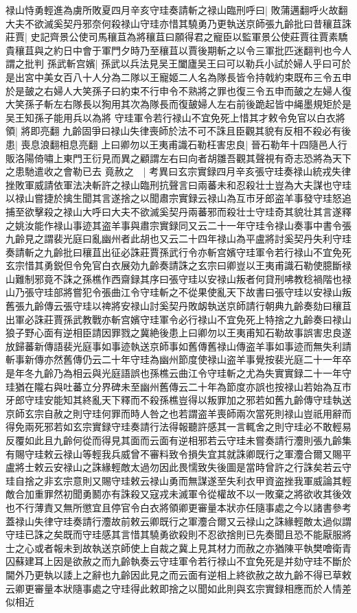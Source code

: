 禄山恃勇輕進為虜所敗夏四月辛亥守珪奏請斬之禄山臨刑呼曰|{
	敗蒲邁翻呼火故翻}
大夫不欲滅奚契丹邪奈何殺禄山守珪亦惜其驍勇乃更執送京師張九齡批曰昔穰苴誅莊賈|{
	史記齊景公使司馬穰苴為將穰苴曰願得君之寵臣以監軍景公使莊賈往賈素驕貴穰苴與之約日中會于軍門夕時乃至穰苴以賈後期斬之以令三軍批匹迷翻判也今人謂之批判}
孫武斬宫嬪|{
	孫武以兵法見吴王闔廬吴王曰可以勒兵小試於婦人乎曰可於是出宮中美女百八十人分為二隊以王寵姬二人名為隊長皆令持戟約束既布三令五申於是皷之右婦人大笑孫子曰約束不行申令不熟將之罪也復三令五申而皷之左婦人復大笑孫子斬左右隊長以狥用其次為隊長而復皷婦人左右前後跪起皆中䋲墨規矩於是吴王知孫子能用兵以為將}
守珪軍令若行禄山不宜免死上惜其才敕令免官以白衣將領|{
	將即亮翻}
九齡固爭曰禄山失律喪師於法不可不誅且臣觀其貌有反相不殺必有後患|{
	喪息浪翻相息亮翻}
上曰卿勿以王夷甫識石勒枉害忠良|{
	晉石勒年十四隨邑人行販洛陽倚嘯上東門王衍見而異之顧謂左右曰向者胡雛吾觀其聲視有奇志恐將為天下之患馳遣收之會勒已去}
竟赦之　|{
	考異曰玄宗實録四月辛亥張守珪奏禄山統戎失律挫敗軍威請依軍法决斬許之禄山臨刑抗聲言曰兩蕃未和忍殺壮士豈為大夫謀也守珪以禄山嘗捷於擒生聞其言遂捨之以聞肅宗實録云禄山為互市牙郎盗羊事發守珪怒追捕至欲擊殺之禄山大呼曰大夫不欲滅奚契丹兩蕃邪而殺壮士守珪奇其貌壮其言遂釋之姚汝能作禄山事迹其盗羊事與肅宗實録同又云二十一年守珪令禄山奏事中書令張九齡見之謂裴光庭曰亂幽州者此胡也又云二十四年禄山為平盧將討奚契丹失利守珪奏請斬之九齡批曰穰苴出征必誅莊賈孫武行令亦斬宫嬪守珪軍令若行禄山不宜免死玄宗惜其勇鋭但令免官白衣展効九齡奏請誅之玄宗曰卿豈以王夷甫識石勒使臆斷禄山難制邪竟不誅之孫樵作西齋録其序曰張守珪以安禄山叛者何貸刑咈教稔禍階也禄山乃張守珪部將嘗犯令張曲江令守珪斬之不從果使亂天下故書曰張守珪以安禄山叛舊張九齡傳云張守珪以禆將安禄山討奚契丹敗衂執送京師請行朝典九齡奏劾曰穰苴出軍必誅莊賈孫武教戰亦斬宫嬪守珪軍令必行禄山不宜免死上特捨之九齡奏曰禄山狼子野心面有逆相臣請因罪戮之冀絶後患上曰卿勿以王夷甫知石勒故事誤害忠良遂放歸蕃新傳語裴光庭事如事迹執送京師事如舊傳舊禄山傳盗羊事如事迹而無失利請斬事新傳亦然舊傳仍云二十年守珪為幽州節度使禄山盗羊事覺按裴光庭二十一年卒是年冬九齡乃為相云與光庭語誤也孫樵云曲江令守珪斬之尤為失實實録二十一年守珪猶在隴右與吐蕃立分界碑未至幽州舊傳云二十年為節度亦誤也按禄山若始為互市牙郎守珪安能知其終亂天下釋而不殺孫樵豈得以叛罪加之邪若如舊九齡傳守珪執送京師玄宗自赦之則守珪何罪而時人咎之也若謂盗羊喪師兩次當死則禄山豈祇用辭而得免兩死邪若如玄宗實録守珪奏請行法得報聽許感其一言輒舍之則守珪必不敢輕易反覆如此且九齡何從而得見其面而云面有逆相邪若云守珪未嘗奏請行灋則張九齡集有賜守珪敕云禄山等輕我兵威曾不審料致令損失宜其就誅卿既行之軍灋合爾又賜平盧將士敕云安禄山之誅緣輕敵太過勿因此畏懦致失後圖是當時曾許之行誅矣若云守珪自捨之非玄宗意則又賜守珪敕云禄山勇而無謀遂至失利衣甲資盗挫我軍威論其輕敵合加重罪然初聞勇鬭亦有誅殺又寇戎未滅軍令從權故不以一敗棄之將欲收其後效也不行薄責又無所懲宜且停官令白衣將領卿更審量本狀亦任隨事處之今以諸書參考蓋禄山失律守珪奏請行灋故前敕云卿既行之軍灋合爾又云禄山之誅緣輕敵太過似謂守珪已誅之矣既而守珪感其言惜其驍勇欲殺則不忍欲捨則已先奏聞且恐不能厭服將士之心或者報未到故執送京師使上自裁之冀上見其材力而赦之亦猶陳平執樊噲衛青囚蘇建耳上因是欲赦之而九齡執奏云守珪軍令若行禄山不宜免死是并劾守珪不斷於閫外乃更執以諉上之辭也九齡因此見之而云面有逆相上終欲赦之故九齡不得已草敕云卿更審量本狀隨事處之守珪得此敕即捨之以聞如此則與玄宗實録相應而於人情差似相近}

